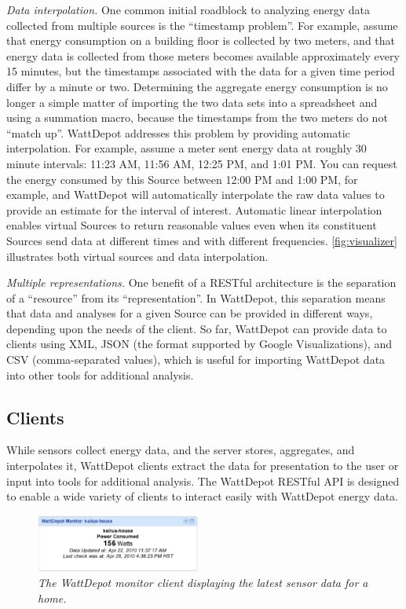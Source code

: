 \documentclass[conference]{IEEEtran}
\begin{document}
{\em Data interpolation.} One common initial roadblock to analyzing energy
data collected from multiple sources is the ``timestamp problem''. For
example, assume that energy consumption on a building floor is collected by
two meters, and that energy data is collected from those meters becomes
available approximately every 15 minutes, but the timestamps associated
with the data for a given time period differ by a minute or two.
Determining the aggregate energy consumption is no longer a simple matter
of importing the two data sets into a spreadsheet and using a summation
macro, because the timestamps from the two meters do not ``match up''.
WattDepot addresses this problem by providing automatic interpolation. For
example, assume a meter sent energy data at roughly 30 minute intervals:
11:23 AM, 11:56 AM, 12:25 PM, and 1:01 PM.  You can request the energy consumed
by this Source between 12:00 PM and 1:00 PM, for example, and WattDepot will
automatically interpolate the raw data values to provide an estimate for
the interval of interest.  Automatic linear interpolation enables virtual Sources
to return reasonable values even when its constituent Sources send data at
different times and with different frequencies.  \figurename \ref{fig:visualizer}
illustrates both virtual sources and data interpolation. 

{\em Multiple representations.} One benefit of a RESTful architecture is
the separation of a ``resource'' from its ``representation''.  In
WattDepot, this separation means that data and analyses for a given Source can
be provided in different ways, depending upon the needs of the client.  So
far, WattDepot can provide data to clients using XML, JSON (the format
supported by Google Visualizations), and CSV (comma-separated values),
which is useful for importing WattDepot data into other tools for
additional analysis.

\subsection{Clients}

While sensors collect energy data, and the server stores, aggregates, and
interpolates it, WattDepot clients extract the data for presentation to the
user or input into tools for additional analysis.  The WattDepot RESTful
API is designed to enable a wide variety of clients to interact easily with
WattDepot energy data.  

\begin{figure}[thb]
  \center
  \includegraphics[width=0.48\textwidth]{monitor.eps}
  \caption{\em \small The WattDepot monitor client displaying the latest sensor
  data for a home.}
  \label{fig:monitor}
\end{figure}
\end{document}
